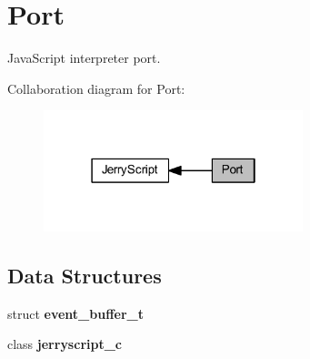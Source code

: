 \section{Port}
\label{group___port}


Java\+Script interpreter port.  


Collaboration diagram for Port\+:
\nopagebreak
\begin{figure}[H]
\begin{center}
\leavevmode
\includegraphics[width=214pt]{group___port}
\end{center}
\end{figure}
\subsection*{Data Structures}
\begin{DoxyCompactItemize}
\item 
struct \textbf{ event\+\_\+buffer\+\_\+t}
\item 
class \textbf{ jerryscript\+\_\+c}
\end{DoxyCompactItemize}
